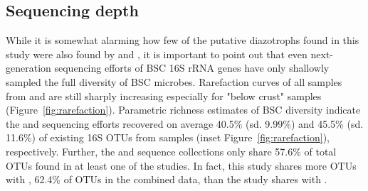 \subsection{Sequencing depth}
While it is somewhat alarming how few of the putative diazotrophs found in
this study were also found by \citet{Garcia_Pichel_2013} and
\citet{Steven_2013}, it is important to point out that even next-generation
sequencing efforts of BSC 16S rRNA genes have only shallowly sampled the full
diversity of BSC microbes.  Rarefaction curves of all samples from
\citet{Steven_2013} and \citet{Garcia_Pichel_2013} are still sharply
increasing especially for "below crust" samples
(Figure~\ref{fig:rarefaction}). Parametric richness estimates of BSC
diversity indicate the \citet{Steven_2013} and \citet{Garcia_Pichel_2013}
sequencing efforts recovered on average 40.5\% (sd. 9.99\%) and 45.5\% (sd.
11.6\%) of existing 16S OTUs from samples (inset
Figure~\ref{fig:rarefaction}), respectively. Further, the \citet{Steven_2013}
and \citet{Garcia_Pichel_2013} sequence collections only share 57.6\% of
total OTUs found in at least one of the studies. In fact, this study shares
more OTUs with \citet{Steven_2013}, 62.4\% of OTUs in the combined data, than
the \citet{Steven_2013} study shares with \citet{Garcia_Pichel_2013}. 

%
